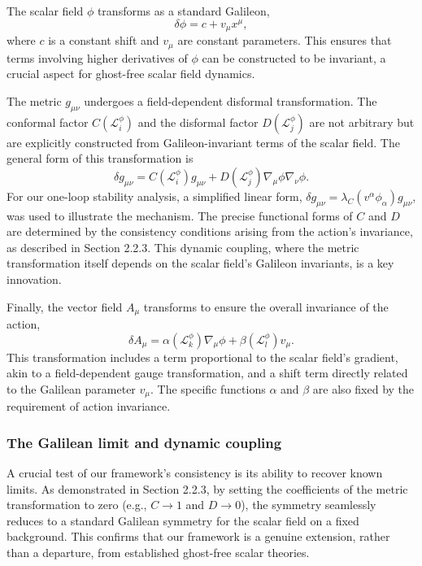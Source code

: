 \documentclass[twocolumn]{aastex631}
\begin{document}
The scalar field $\phi$ transforms as a standard Galileon,
\begin{equation}
\delta \phi = c + v_\mu x^\mu,
\end{equation}
where $c$ is a constant shift and $v_\mu$ are constant parameters. This ensures that terms involving higher derivatives of $\phi$ can be constructed to be invariant, a crucial aspect for ghost-free scalar field dynamics.

The metric $g_{\mu\nu}$ undergoes a field-dependent disformal transformation. The conformal factor $C(\mathcal{L}_i^\phi)$ and the disformal factor $D(\mathcal{L}_j^\phi)$ are not arbitrary but are explicitly constructed from Galileon-invariant terms of the scalar field. The general form of this transformation is
\begin{equation}
\delta g_{\mu\nu} = C(\mathcal{L}_i^\phi) g_{\mu\nu} + D(\mathcal{L}_j^\phi) \nabla_\mu \phi \nabla_\nu \phi.
\end{equation}
For our one-loop stability analysis, a simplified linear form, $\delta g_{\mu\nu} = \lambda_C (v^\alpha \phi_\alpha) g_{\mu\nu}$, was used to illustrate the mechanism. The precise functional forms of $C$ and $D$ are determined by the consistency conditions arising from the action's invariance, as described in Section 2.2.3. This dynamic coupling, where the metric transformation itself depends on the scalar field's Galileon invariants, is a key innovation.

Finally, the vector field $A_\mu$ transforms to ensure the overall invariance of the action,
\begin{equation}
\delta A_\mu = \alpha(\mathcal{L}_k^\phi) \nabla_\mu \phi + \beta(\mathcal{L}_l^\phi) v_\mu.
\end{equation}
This transformation includes a term proportional to the scalar field's gradient, akin to a field-dependent gauge transformation, and a shift term directly related to the Galilean parameter $v_\mu$. The specific functions $\alpha$ and $\beta$ are also fixed by the requirement of action invariance.

\subsubsection{The Galilean limit and dynamic coupling}
A crucial test of our framework's consistency is its ability to recover known limits. As demonstrated in Section 2.2.3, by setting the coefficients of the metric transformation to zero (e.g., $C \to 1$ and $D \to 0$), the symmetry seamlessly reduces to a standard Galilean symmetry for the scalar field on a fixed background. This confirms that our framework is a genuine extension, rather than a departure, from established ghost-free scalar theories.
\end{document}
